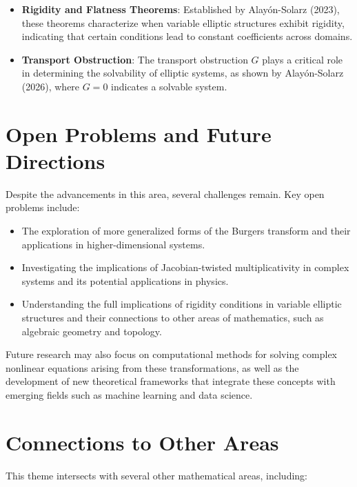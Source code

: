 \documentclass[11pt,a4paper]{article}
\begin{document}
\begin{itemize}
\item \textbf{Rigidity and Flatness Theorems}: Established by Alayón-Solarz (2023), these theorems characterize when variable elliptic structures exhibit rigidity, indicating that certain conditions lead to constant coefficients across domains.
\end{itemize}

\begin{itemize}
\item \textbf{Transport Obstruction}: The transport obstruction \( G \) plays a critical role in determining the solvability of elliptic systems, as shown by Alayón-Solarz (2026), where \( G = 0 \) indicates a solvable system.
\end{itemize}

\section{Open Problems and Future Directions}

Despite the advancements in this area, several challenges remain. Key open problems include:

\begin{itemize}
\item The exploration of more generalized forms of the Burgers transform and their applications in higher-dimensional systems.
\item Investigating the implications of Jacobian-twisted multiplicativity in complex systems and its potential applications in physics.
\item Understanding the full implications of rigidity conditions in variable elliptic structures and their connections to other areas of mathematics, such as algebraic geometry and topology.
\end{itemize}

Future research may also focus on computational methods for solving complex nonlinear equations arising from these transformations, as well as the development of new theoretical frameworks that integrate these concepts with emerging fields such as machine learning and data science.

\section{Connections to Other Areas}

This theme intersects with several other mathematical areas, including:
\end{document}
